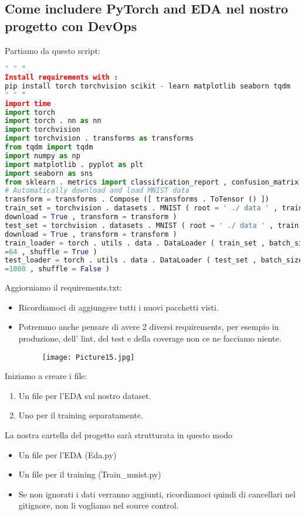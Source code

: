 \documentclass[a4paper,12pt]{article}
\begin{document}
\subsection{Come includere PyTorch and EDA nel nostro progetto con DevOps}
Partiamo da questo script:
\begin{lstlisting}[language=Python, basicstyle=\ttfamily\footnotesize, breaklines=true, frame=single]
" " "
Install requirements with :
pip install torch torchvision scikit - learn matplotlib seaborn tqdm
" " "
import time
import torch
import torch . nn as nn
import torchvision
import torchvision . transforms as transforms
from tqdm import tqdm
import numpy as np
import matplotlib . pyplot as plt
import seaborn as sns
from sklearn . metrics import classification_report , confusion_matrix
# Automatically download and load MNIST data
transform = transforms . Compose ([ transforms . ToTensor () ])
train_set = torchvision . datasets . MNIST ( root = ' ./ data ' , train = True ,
download = True , transform = transform )
test_set = torchvision . datasets . MNIST ( root = ' ./ data ' , train = False ,
download = True , transform = transform )
train_loader = torch . utils . data . DataLoader ( train_set , batch_size
=64 , shuffle = True )
test_loader = torch . utils . data . DataLoader ( test_set , batch_size
=1000 , shuffle = False )
\end{lstlisting}
\vspace{2em}
Aggiorniamo il requirements.txt:
\begin{itemize}
    \item Ricordiamoci di aggiungere tutti i nuovi pacchetti visti.
    \item Potremmo anche pensare di avere 2 diversi requirements, per esempio in produzione, dell' lint, del test e della coverage non ce ne facciamo niente.
    \begin{figure}[H]
        \centering
        \texttt{[image: Picture15.jpg]}
        \label{etichetta37}
    \end{figure}
\end{itemize}
\vspace{2em}
Iniziamo a creare i file:
\begin{enumerate}
    \item Un file per l'EDA sul nostro dataset.
    \item Uno per il training separatamente.
\end{enumerate}
\newpage
La nostra cartella del progetto sarà strutturata in questo modo 
\begin{itemize}
    \item Un file per l'EDA (Eda.py)
    \item Un file per il training (Train\_mnist.py)
    \item Se non ignorati i dati verranno aggiunti, ricordiamoci quindi di cancellari nel gitignore, non li vogliamo nel source control.
\end{itemize}
\end{document}
